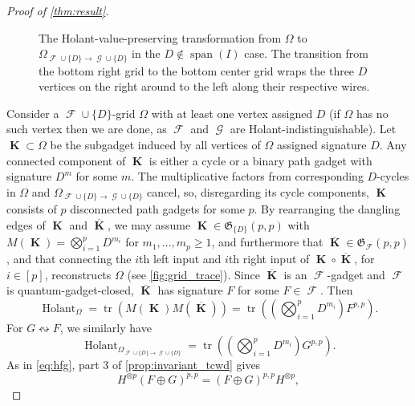 \documentclass{article}
\theoremstyle{remark}
\theoremstyle{definition}
\DeclareMathOperator{\spn}{span}
\DeclareMathOperator{\tr}{tr}
\DeclareMathOperator{\vk}{\mathbf{K}}
\DeclareMathOperator{\fc}{\mathcal{F}}
\DeclareMathOperator{\gc}{\mathcal{G}}
\DeclareMathOperator{\holant}{Holant}
\begin{document}
\begin{proof}[Proof of \autoref{thm:result}]
\begin{figure}[ht!]
         \caption{The Holant-value-preserving transformation from $\Omega$ to
        $\Omega_{\fc\cup\{D\}\to\gc\cup\{D\}}$ in the $D \not\in \spn(I)$ case.
        The transition from the bottom right grid to the bottom center grid wraps the
        three $D$ vertices on the right around to the left along their respective wires.}
        \label{fig:grid_trace}
    \end{figure}
    Consider a $\fc \cup \{D\}$-grid $\Omega$ with at least one vertex assigned $D$ (if $\Omega$ has
    no such vertex then we are done, as $\fc$ and $\gc$ are Holant-indistinguishable). Let $\vk \subset
    \Omega$ be the subgadget induced by all vertices of $\Omega$ assigned signature $D$.
    Any connected component of $\vk$ is either a cycle or 
    a binary path gadget with signature $D^m$ for some $m$. 
    The multiplicative factors from corresponding $D$-cycles in $\Omega$
    and $\Omega_{\fc\cup\{D\}\to\gc\cup\{D\}}$ cancel, so, disregarding its cycle components,
    $\vk$ consists of $p$ disconnected path gadgets for some $p$. By rearranging the dangling edges
    of $\vk$ and $\overline{\vk}$,
    we may assume $\vk \in \mathfrak{G}_{\{D\}}(p,p)$ with
    $M(\vk) = \bigotimes_{i=1}^p D^{m_i}$ for $m_1,\ldots,m_p \geq 1$, and furthermore that
    $\overline{\vk} \in \mathfrak{G}_{\fc}(p,p)$, and that
    connecting the $i$th left input and $i$th right input of $\vk \circ \overline{\vk}$,
    for $i \in [p]$, reconstructs $\Omega$ (see \autoref{fig:grid_trace}).
    Since $\overline{\vk}$ is an $\fc$-gadget and $\fc$ is
    quantum-gadget-closed, $\overline{\vk}$ has signature $F$ for some $F \in \fc$. Then
    \begin{equation}
        \label{eq:trace_f}
        \holant_\Omega = \tr\left(M(\vk) M(\overline{\vk})\right)
        = \tr\left(\left(\bigotimes_{i=1}^p D^{m_i}\right) F^{p,p}\right).
    \end{equation}
    For $G \leftrightsquigarrow F$, we similarly have
    \begin{equation}
        \label{eq:trace_g}
        \holant_{\Omega_{\fc\cup\{D\}\to\gc\cup\{D\}}}
        = \tr\left(\left(\bigotimes_{i=1}^p D^{m_i}\right) G^{p,p}\right).
    \end{equation}
    As in \eqref{eq:hfg}, part 3 of \autoref{prop:invariant_tcwd} gives
    \[
        H^{\otimes p}(F \oplus G)^{p,p} = (F \oplus G)^{p,p}H^{\otimes p},
\]
\end{proof}
\end{document}
